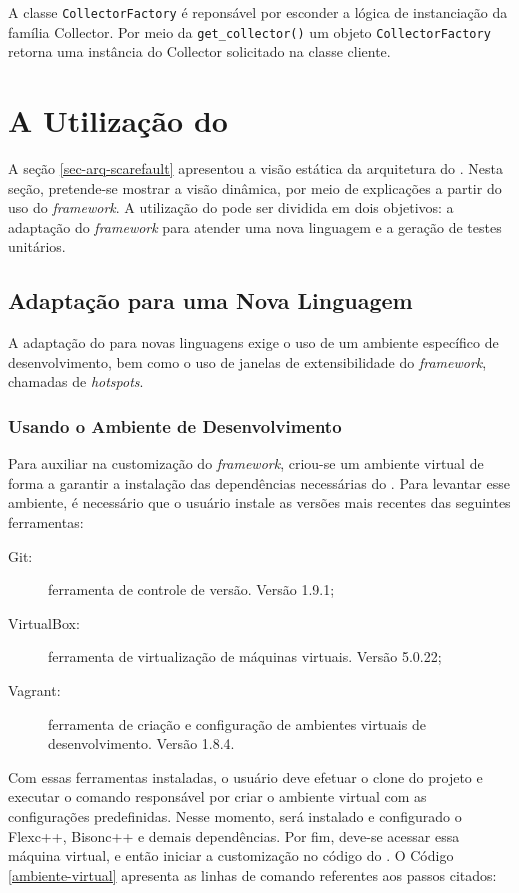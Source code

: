 A classe \lstinline|CollectorFactory| é reponsável por esconder a lógica de instanciação
da família \textsf{Collector}. Por meio da \lstinline|get_collector()| um objeto
\lstinline|CollectorFactory| retorna uma instância do \textsf{Collector} solicitado na
classe cliente.

\section{A Utilização do \Scarefault} \label{sec-util-scarefault}
A seção \ref{sec-arq-scarefault} apresentou a visão estática da arquitetura do
\Scarefault. Nesta seção, pretende-se mostrar a visão dinâmica, por meio
de explicações a partir do uso do \textit{framework}. A utilização do
\scarefault pode ser dividida em dois objetivos: a adaptação
do \textit{framework} para atender uma nova linguagem e a geração de testes unitários.
 
\subsection{Adaptação para uma Nova Linguagem}
A adaptação do \scarefault para novas linguagens exige o uso de um ambiente
específico de desenvolvimento, bem como o uso de janelas de extensibilidade
do \textit{framework}, chamadas de \textit{hotspots}.


\subsubsection{Usando o Ambiente de Desenvolvimento}
Para auxiliar na customização do \textit{framework}, criou-se um ambiente
virtual de forma a garantir a instalação das dependências necessárias do
\Scarefault. Para levantar esse ambiente, é necessário que o usuário instale as
versões mais recentes das seguintes ferramentas: 

\begin{description}
\item[Git:] ferramenta de controle de versão. Versão 1.9.1;
\item[VirtualBox:] ferramenta de virtualização de máquinas virtuais. Versão 5.0.22;
\item[Vagrant:] ferramenta de criação e configuração de ambientes virtuais de desenvolvimento. Versão 1.8.4.
\end{description} 

Com essas ferramentas instaladas, o usuário deve efetuar o clone do projeto
e executar o comando responsável por criar o ambiente virtual com as configurações
predefinidas. Nesse momento, será instalado e configurado o \textsf{Flexc++},
\textsf{Bisonc++} e demais dependências. Por fim, deve-se acessar essa máquina
virtual, e então iniciar a customização no código do \Scarefault. O Código
\ref{ambiente-virtual} apresenta as linhas de comando referentes aos passos citados:

